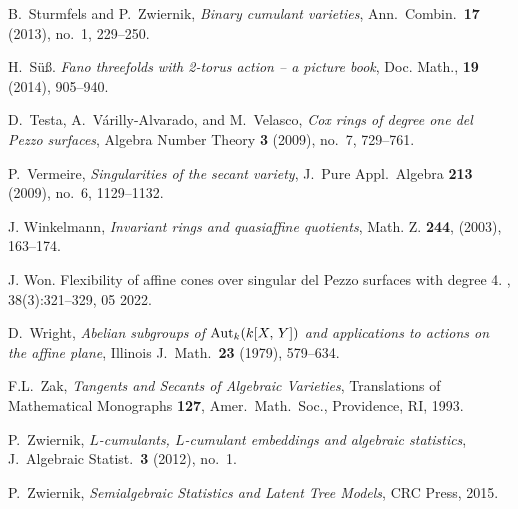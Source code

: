 
B.~Sturmfels and P.~Zwiernik,
\emph{Binary cumulant varieties},
Ann.\ Combin.\ \textbf{17} (2013), no.~1, 229--250.


H.~S\"u{\ss}. \emph{Fano threefolds with 2-torus action -- a picture book}, 	Doc. Math., \textbf{19} (2014), 905--940.




D.~Testa, A.~V{\'a}rilly-Alvarado, and M.~Velasco,
\emph{Cox rings of degree one del Pezzo surfaces},
Algebra Number Theory \textbf{3} (2009), no.~7, 729--761.

P.~Vermeire,
\emph{Singularities of the secant variety},
J.\ Pure Appl.\ Algebra \textbf{213} (2009), no.~6, 1129--1132.

J. Winkelmann,
  \emph{Invariant rings and quasiaffine quotients}, Math. Z. \textbf{244},  (2003), 163--174.

J. Won.
\newblock Flexibility of affine cones over singular del {P}ezzo surfaces with degree 4.
, 38(3):321--329, 05 2022.

D.~Wright, \emph{Abelian subgroups of ${\rm Aut}_{k}(k[X,\,Y])$ and applications to
actions on the affine plane}, Illinois J.\ Math.\ \textbf{23} (1979),
579--634.



F.L.~Zak,
\emph{Tangents and Secants of Algebraic Varieties},
Translations of Mathematical Monographs \textbf{127},
Amer.\ Math.\ Soc., Providence, RI, 1993.

P.~Zwiernik,
\emph{$L$-cumulants, $L$-cumulant embeddings and algebraic statistics},
J.\ Algebraic Statist.\ \textbf{3} (2012), no.~1.

P.~Zwiernik,
\emph{Semialgebraic Statistics and Latent Tree Models},
CRC Press, 2015.
